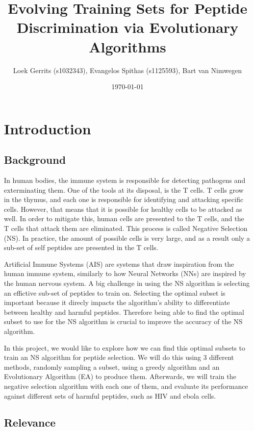\documentclass{article}
\title{Evolving Training Sets for Peptide Discrimination via Evolutionary Algorithms}
\author{Loek Gerrits (s1032343), Evangelos Spithas (s1125593), Bart van Nimwegen}
\date{\today}
\begin{document}
 

\maketitle

\section{Introduction}

\subsection{Background}

In human bodies, the immune system is responsible for detecting pathogens and exterminating them. 
One of the tools at its disposal, is the T cells. T cells grow in the thymus, and each one is responsible for
identifying and attacking specific cells. However, that means that it is possible for healthy cells to be
attacked as well. In order to mitigate this, human cells are presented to the T cells, and the T cells that attack them 
are eliminated. This process is called Negative Selection (NS). In practice, the amount of possible cells is very large, and as a result only a sub-set of self peptides are presented
in the T cells. 

Artificial Immune Systems (AIS) are systems that draw inspiration from the human immune system, similarly to how Neural 
Networks (NNs) are inspired by the human nervous system. A big challenge in using the NS algorithm is selecting an effictive sub-set of peptides to train on.
Selecting the optimal subset is important because it direcly impacts the algorithm's ability to differentiate between healthy and harmful peptides.
Therefore being able to find the optimal subset to use for the NS algorithm is crucial to improve the accuracy of the NS algorithm.  

In this project, we would like to explore how we can find this optimal subsets to train an NS algorithm for peptide selection. We will do this using 3 different methods, randomly 
sampling a subset, using a greedy algorithm and an Evolutionary Algorithm (EA) to produce them. Afterwards, we will train the 
negative selection algorithm with each one of them, and evaluate its performance against different sets of harmful 
peptides, such as HIV and ebola cells. 

\subsection{Relevance}
\end{document}

